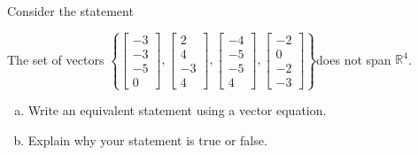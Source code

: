 
\begin{exerciseStatement}


Consider the statement 
\begin{center}\begin{minipage}{0.8\textwidth}
 The set of vectors \( \left\{ \left[\begin{array}{c}
-3 \\
-3 \\
-5 \\
0
\end{array}\right] , \left[\begin{array}{c}
2 \\
4 \\
-3 \\
4
\end{array}\right] , \left[\begin{array}{c}
-4 \\
-5 \\
-5 \\
4
\end{array}\right] , \left[\begin{array}{c}
-2 \\
0 \\
-2 \\
-3
\end{array}\right] \right\} \)does not span \(\mathbb{R}^4\). 
\end{minipage}\end{center}
    


\begin{enumerate}[(a)]
\item  Write an equivalent statement using a vector equation.
\item  Explain why your statement is true or false.
\end{enumerate}
    
\end{exerciseStatement}
    
